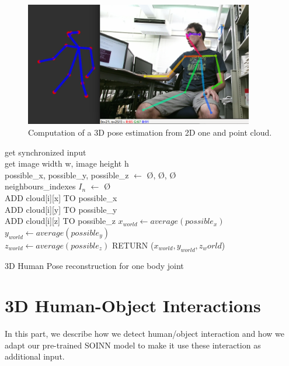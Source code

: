 \begin{figure}[htp]
\centering
\includegraphics[width=100mm, keepaspectratio]{images/openpose3d.png}
\caption{Computation of a 3D pose estimation from 2D one and point cloud.}
\label{fig:openpose3d}
\end{figure}

\begin{algorithm}[htp]
    get synchronized input \\
    get image width w, image height h \\
    possible\_x, possible\_y, possible\_z $\leftarrow$ \O, \O, \O \\
    neighbours\_indexes $I_n$ $\leftarrow$ \O \\
    {
    {ADD cloud[i][x] TO possible\_x \\
    ADD cloud[i][y] TO possible\_y \\
    ADD cloud[i][z] TO possible\_z}
    $x_{world} \leftarrow average(possible_x)$ \\
    $y_{world} \leftarrow average(possible_y)$ \\
    $z_{world} \leftarrow average(possible_z)$}
    RETURN ($x_{world}, y_{world}, z_world$)
    \caption{3D Human Pose reconstruction for one body joint}
    \label{alg:openpose3d}
\end{algorithm}

\section{3D Human-Object Interactions}
In this part, we describe how we detect human/object interaction and how we adapt our pre-trained SOINN model to make it use these interaction as additional input.


